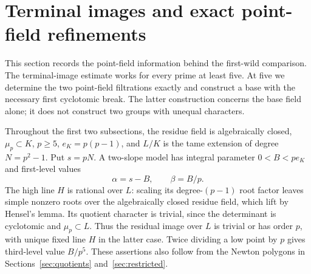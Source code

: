 \section{Terminal images and exact point-field refinements}\label{sec:point-refinements}
This section records the point-field information behind the first-wild comparison. The terminal-image estimate works for every prime at least five. At five we determine the two point-field filtrations exactly and construct a base with the necessary first cyclotomic break. The latter construction concerns the base field alone; it does not construct two groups with unequal characters.

Throughout the first two subsections, the residue field is algebraically closed, $\mu_p\subset K$, $p\ge5$, $e_K=p(p-1)$, and $L/K$ is the tame extension of degree $N=p^2-1$. Put $s=pN$. A two-slope model has integral parameter $0<B<pe_K$ and first-level values
\[
                     \alpha=s-B,\qquad \beta=B/p.
\]
The high line $H$ is rational over $L$: scaling its degree-$(p-1)$ root factor leaves simple nonzero roots over the algebraically closed residue field, which lift by Hensel's lemma. Its quotient character is trivial, since the determinant is cyclotomic and $\mu_p\subset L$. Thus the residual image over $L$ is trivial or has order $p$, with unique fixed line $H$ in the latter case. Twice dividing a low point by $p$ gives third-level value $B/p^5$. These assertions also follow from the Newton polygons in Sections~\ref{sec:quotients} and~\ref{sec:restricted}.

